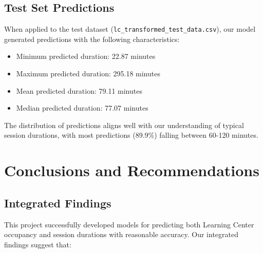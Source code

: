 \documentclass[12pt,letterpaper]{article}
\begin{document}
\subsection{Test Set Predictions}

When applied to the test dataset (\texttt{lc\_transformed\_test\_data.csv}), our model generated predictions with the following characteristics:

\begin{itemize}
    \item Minimum predicted duration: 22.87 minutes
    \item Maximum predicted duration: 295.18 minutes
    \item Mean predicted duration: 79.11 minutes
    \item Median predicted duration: 77.07 minutes
\end{itemize}

The distribution of predictions aligns well with our understanding of typical session durations, with most predictions (89.9\%) falling between 60-120 minutes.

\section{Conclusions and Recommendations}

\subsection{Integrated Findings}

This project successfully developed models for predicting both Learning Center occupancy and session durations with reasonable accuracy. Our integrated findings suggest that:
\end{document}
